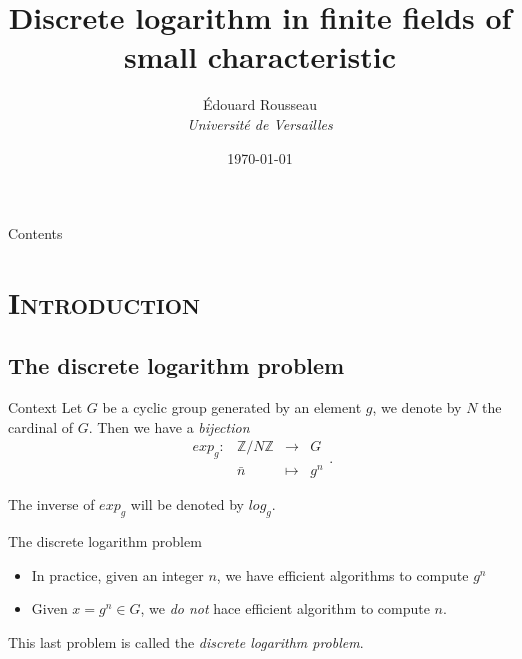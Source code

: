 \documentclass[xcolor=x11names,compress]{beamer}
\theoremstyle{break}
\theoremstyle{sc}
\theoremstyle{definition}
\theoremstyle{remark}
\begin{document}
\begin{frame}
  \title{Discrete logarithm in finite fields of small characteristic}
\author{
Édouard Rousseau\\
{\it Université de Versailles\\}
}
\date{\today}
\titlepage
\end{frame}

\begin{frame}{Contents}
\tableofcontents
\end{frame}

\section{\scshape Introduction}
\subsection{The discrete logarithm problem}
\begin{frame}{Context}
  Let $G$ be a cyclic group generated by an element $g$, we denote by $N$ the
  cardinal of $G$. Then we have a \emph{bijection}
  \[
    \begin{array}{cccc}
      exp_g: & \mathbb{Z}/N\mathbb{Z} & \to & G \\
      & \bar n & \mapsto & g^n
    \end{array}.
  \]

  The inverse of $exp_g$ will be denoted by $log_g$. 
\end{frame}

\begin{frame}{The discrete logarithm problem}
  \begin{itemize}
    \item In practice, given an integer $n$, we have efficient algorithms
      to compute $g^n$
    \item Given $x = g^n \in G$, we \emph{do not} hace efficient algorithm
      to compute $n$.
  \end{itemize}
  This last problem is called the \emph{discrete logarithm problem}.
\end{frame}
\end{document}
